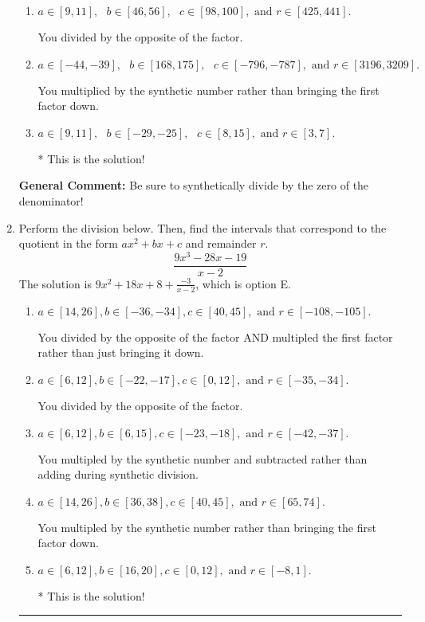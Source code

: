 \documentclass{extbook}[14pt]
\newcommand{\litem}[1]{\item #1

\rule{\textwidth}{0.4pt}}
\begin{document}
\begin{enumerate}
{\begin{enumerate}[label=\Alph*.]
 You divided by the opposite of the factor AND multiplied the first factor rather than just bringing it down.
\item \( a \in [9, 11], \text{   } b \in [46, 56], \text{   } c \in [98, 100], \text{   and   } r \in [425, 441]. \)

 You divided by the opposite of the factor.
\item \( a \in [-44, -39], \text{   } b \in [168, 175], \text{   } c \in [-796, -787], \text{   and   } r \in [3196, 3209]. \)

 You multiplied by the synthetic number rather than bringing the first factor down.
\item \( a \in [9, 11], \text{   } b \in [-29, -25], \text{   } c \in [8, 15], \text{   and   } r \in [3, 7]. \)

* This is the solution!
\end{enumerate}

\textbf{General Comment:} Be sure to synthetically divide by the zero of the denominator!
}
\litem{
Perform the division below. Then, find the intervals that correspond to the quotient in the form $ax^2+bx+c$ and remainder $r$.
\[ \frac{9x^{3} -28 x -19}{x -2} \]The solution is \( 9x^{2} +18 x + 8 + \frac{-3}{x -2} \), which is option E.\begin{enumerate}[label=\Alph*.]
\item \( a \in [14, 26], b \in [-36, -34], c \in [40, 45], \text{ and } r \in [-108, -105]. \)

 You divided by the opposite of the factor AND multipled the first factor rather than just bringing it down.
\item \( a \in [6, 12], b \in [-22, -17], c \in [0, 12], \text{ and } r \in [-35, -34]. \)

 You divided by the opposite of the factor.
\item \( a \in [6, 12], b \in [6, 15], c \in [-23, -18], \text{ and } r \in [-42, -37]. \)

 You multipled by the synthetic number and subtracted rather than adding during synthetic division.
\item \( a \in [14, 26], b \in [36, 38], c \in [40, 45], \text{ and } r \in [65, 74]. \)

 You multipled by the synthetic number rather than bringing the first factor down.
\item \( a \in [6, 12], b \in [16, 20], c \in [0, 12], \text{ and } r \in [-8, 1]. \)

* This is the solution!
\end{enumerate}

}
\end{enumerate}
\end{document}

